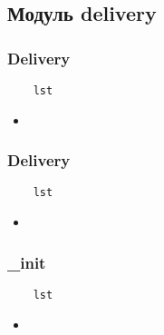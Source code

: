 \subsection{Модуль delivery}

\subsubsection{Delivery}

\begin{lstlisting}
    lst
\end{lstlisting}

\begin{itemize}
    \item \verb||
\end{itemize}

\subsubsection{Delivery}

\begin{lstlisting}
    lst
\end{lstlisting}

\begin{itemize}
    \item \verb||
\end{itemize}

\subsubsection{\_init}

\begin{lstlisting}
    lst
\end{lstlisting}

\begin{itemize}
    \item \verb||
\end{itemize}


